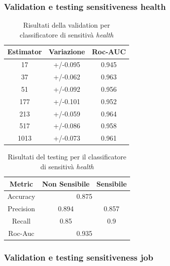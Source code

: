 \subsubsection{Validation e testing sensitiveness health}
\label{sssec:val_testing_health}

\begin{table}[h]

\centering
\begin{tabular}{|c|c|c|}
\hline
\textbf{Estimator} & \textbf{Variazione} & \textbf{Roc-AUC} \\ \hline
17 & +/-0.095 & 0.945 \\ \hline
37 & +/-0.062 & 0.963 \\ \hline
51 & +/-0.092 & 0.956 \\ \hline
177 & +/-0.101 & 0.952 \\ \hline
213 & +/-0.059 & 0.964 \\ \hline
517 & +/-0.086 & 0.958 \\ \hline
1013 & +/-0.073 & 0.961 \\ \hline
\end{tabular}
\caption{Risultati della validation per classificatore di sensitivà \textit{health}}
\label{tbl:val_sens_health}
\end{table}
\FloatBarrier

\begin{table}[h]

\centering
\begin{tabular}{|c|c|c|}
\hline
\textbf{Metric} & \textbf{Non Sensibile} & \textbf{Sensibile} \\ \hline
Accuracy & \multicolumn{2}{c|}{0.875} \\ \hline
Precision & 0.894 & 0.857 \\ \hline
Recall & 0.85 & 0.9 \\ \hline
Roc-Auc & \multicolumn{2}{c|}{0.935} \\ \hline
\end{tabular}
\caption{Risultati del testing per il classificatore di sensitivà \textit{health}}
\label{tbl:training_sens_health}
\end{table}
\FloatBarrier


\subsubsection{Validation e testing sensitiveness job}
\label{sssec:val_testing_job}

